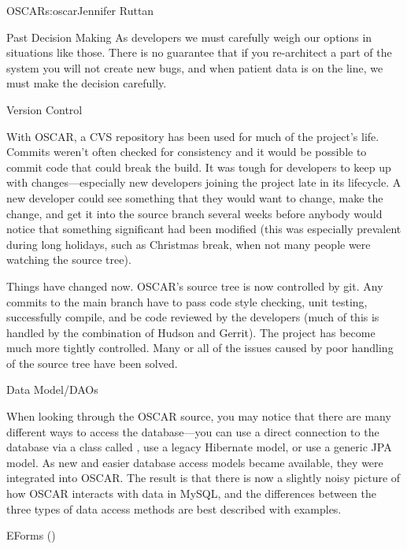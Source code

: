 \begin{aosachapter}{OSCAR}{s:oscar}{Jennifer Ruttan}
\begin{aosasect1}{Past Decision Making}
As developers we must carefully weigh our options in situations like
those. There is no guarantee that if you re-architect a part of the
system you will not create new bugs, and when patient data is on the
line, we must make the decision carefully.

\end{aosasect1}

\begin{aosasect1}{Version Control}

With OSCAR, a CVS repository has been used for much of the project's
life. Commits weren't often checked for consistency and it would be
possible to commit code that could break the build. It was tough for
developers to keep up with changes---especially new developers joining
the project late in its lifecycle. A new developer could see something
that they would want to change, make the change, and get it into the
source branch several weeks before anybody would notice that something
significant had been modified (this was especially prevalent during
long holidays, such as Christmas break, when not many people were
watching the source tree).

Things have changed now. OSCAR's source tree is now controlled by
git. Any commits to the main branch have to pass code style checking,
unit testing, successfully compile, and be code reviewed by the
developers (much of this is handled by the combination of Hudson and
Gerrit). The project has become much more tightly controlled. Many
or all of the issues caused by poor handling of the
source tree have been solved.

\end{aosasect1}

\begin{aosasect1}{Data Model/DAOs}

When looking through the OSCAR source, you may notice that there are
many different ways to access the database---you can use a direct
connection to the database via a class called , use a
legacy Hibernate model, or use a generic JPA model. As new and easier
database access models became available, they were integrated into
OSCAR. The result is that there is now a slightly noisy picture of how
OSCAR interacts with data in MySQL, and the differences between the
three types of data access methods are best described with examples.

\end{aosasect1}

\begin{aosasect1}{EForms ()}


\end{aosasect1}
\end{aosachapter}
